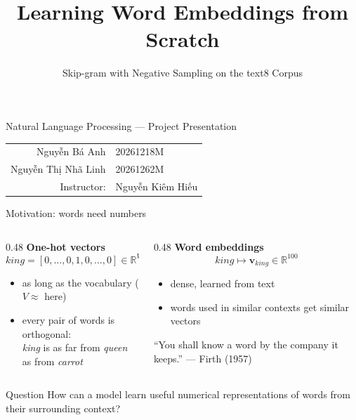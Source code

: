 \documentclass[aspectratio=169,11pt]{beamer}
\title{Learning Word Embeddings from Scratch}
\subtitle{Skip-gram with Negative Sampling on the text8 Corpus}
\newcommand{\muted}[1]{\textcolor{muted}{#1}}
\begin{document}
\begin{frame}[plain]
    \vfill
    \centering
    {\huge\bfseries\inserttitle\par}
    \vspace{3mm}
    {\large\insertsubtitle\par}
    \vspace{8mm}
    {\color{muted}Natural Language Processing --- Project Presentation\par}
    \vspace{8mm}
    \begin{tabular}{rl}
        Nguyễn Bá Anh & 20261218M \\
        Nguyễn Thị Nhã Linh & 20261262M \\[2mm]
        \muted{Instructor:} & Nguyễn Kiêm Hiếu \\
    \end{tabular}
    \vfill
\end{frame}

\begin{frame}{Motivation: words need numbers}
    \begin{columns}[T]
        \begin{column}{0.48\textwidth}
            \textbf{One-hot vectors}
            \[
                \textit{king} = [0, \dots, 0, 1, 0, \dots, 0] \in \mathbb{R}^{V}
            \]
            \begin{itemize}
                \item as long as the vocabulary ($V \approx$ \FinalVocab{} here)
                \item every pair of words is orthogonal:\\
                      \textit{king} is as far from \textit{queen} as from \textit{carrot}
            \end{itemize}
        \end{column}
        \begin{column}{0.48\textwidth}
            \textbf{Word embeddings}
            \[
                \textit{king} \mapsto \mathbf{v}_{\textit{king}} \in \mathbb{R}^{100}
            \]
            \begin{itemize}
                \item dense, learned from text
                \item words used in similar contexts get similar vectors
            \end{itemize}
            \vspace{2mm}
            \muted{\small ``You shall know a word by the company it keeps.'' --- Firth (1957)}
        \end{column}
    \end{columns}
    \vfill
    \begin{block}{Question}
        How can a model learn useful numerical representations of words from their surrounding context?
    \end{block}
\end{frame}
\end{document}
